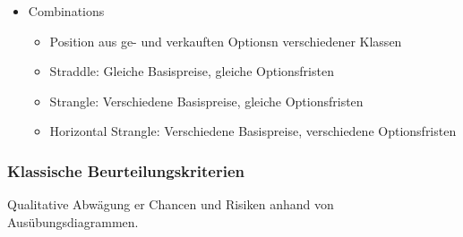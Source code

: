\begin{itemize}
\begin{itemize}
\begin{itemize}
			\begin{itemize}
				\item Money Spread: Verschiedene Basispreise, gleiche Optionsfristen
				\item Time Spread: Verschiedene Optionsfristen, gleiche Basispreise
				\item Diagonal Spread: Verschiedenen Basispreise, verschiedene Optionsfristen
			\end{itemize}
			\item Ratio Spread: Anzahl der Calls (bzw. Puts) long entspricht nicht der Anzahl an Calls (Puts) short)
			\item Beispiel Butterfly Spread: Bei dem Long Butterfly Spread werden zwei Calls gekauft und zwei Calls verkauft. Der erste gekaufte Call wird zu einem niedrigeren Kurs des Underlyings gekauft (in-the-money) und der zweite gekaufte Call wird zu einem höheren Kurs des Underlyings (out-of-the-money) erworben. Zusätzlich werden noch zwei Calls verkauft zum aktuellen Kurs des Underlyings (at-the-money)\footnote{\url{https://de.wikipedia.org/wiki/Optionsstrategie\#Butterfly_Spread}}
		\end{itemize}
		\item Combinations
			\begin{itemize}
				\item Position aus ge- und verkauften Optionsn verschiedener Klassen
				\item Straddle: Gleiche Basispreise, gleiche Optionsfristen
				\item Strangle: Verschiedene Basispreise, gleiche Optionsfristen
				\item Horizontal Strangle: Verschiedene Basispreise, verschiedene Optionsfristen
			\end{itemize}
	\end{itemize}
\end{itemize}



\subsubsection{Klassische Beurteilungskriterien}
Qualitative Abwägung er Chancen und Risiken anhand von Ausübungsdiagrammen.
\newline

